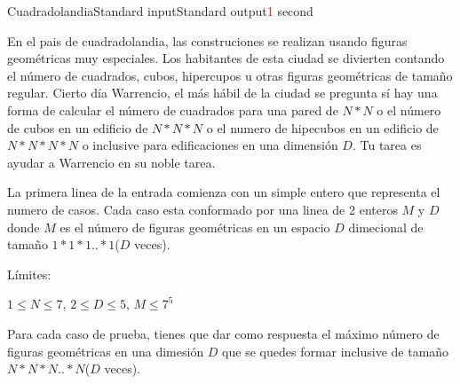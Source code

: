 \begin{problem}{Cuadradolandia}{Standard input}{Standard output}{\textcolor{red}{1} second}{}

En el pais de cuadradolandia, las construciones se realizan usando figuras geométricas muy especiales. Los habitantes de esta ciudad se divierten contando el número de cuadrados, cubos, hipercupos u otras figuras geométricas de tamaño regular. Cierto día Warrencio, el más hábil de la ciudad se pregunta sí hay una forma de calcular el número de cuadrados para una pared de $N*N$ o el número de cubos en un edificio de $N*N*N$ o el numero de hipecubos en un edificio de $N*N*N*N$ o inclusive para edificaciones en una dimensión $D$. Tu tarea es ayudar a Warrencio en su noble tarea.

\InputFile
La primera linea de la entrada comienza con un simple entero que representa el numero de casos. Cada caso esta conformado por una linea de 2 enteros $M$ y $D$ donde $M$ es el número de figuras geométricas en un espacio $D$ dimecional de tamaño $1*1*1..*1$($D$ veces). 

Límites:

$ 1 \leq N \leq 7$, $ 2 \leq D \leq 5$, $M \leq 7^5$ 

\OutputFile
Para cada caso de prueba, tienes que dar como respuesta el máximo número de figuras geométricas en una dimesión $D$ que se quedes formar inclusive de tamaño $N*N*N..*N$($D$ veces). 


\Example

\begin{example}
\end{example}

\end{problem}
